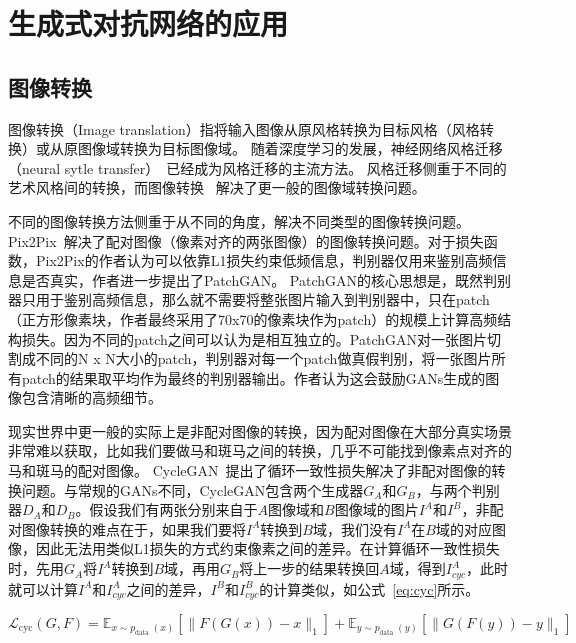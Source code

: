 \section{生成式对抗网络的应用}

\subsection{图像转换}

图像转换（Image translation）指将输入图像从原风格转换为目标风格（风格转换）或从原图像域转换为目标图像域。 随着深度学习的发展，神经网络风格迁移（neural sytle transfer）~\cite{transfer0,transfer1,transfer2}已经成为风格迁移的主流方法。 风格迁移侧重于不同的艺术风格间的转换，而图像转换~\cite{i2i0,i2i1,i2i2,cyclegan} 解决了更一般的图像域转换问题。

不同的图像转换方法侧重于从不同的角度，解决不同类型的图像转换问题。Pix2Pix~\cite{pix2pix}解决了配对图像（像素对齐的两张图像）的图像转换问题。对于损失函数，Pix2Pix的作者认为可以依靠L1损失约束低频信息，判别器仅用来鉴别高频信息是否真实，作者进一步提出了PatchGAN。 PatchGAN的核心思想是，既然判别器只用于鉴别高频信息，那么就不需要将整张图片输入到判别器中，只在patch（正方形像素块，作者最终采用了70x70的像素块作为patch）的规模上计算高频结构损失。因为不同的patch之间可以认为是相互独立的。PatchGAN对一张图片切割成不同的N x N大小的patch，判别器对每一个patch做真假判别，将一张图片所有patch的结果取平均作为最终的判别器输出。作者认为这会鼓励GANs生成的图像包含清晰的高频细节。

现实世界中更一般的实际上是非配对图像的转换，因为配对图像在大部分真实场景非常难以获取，比如我们要做马和斑马之间的转换，几乎不可能找到像素点对齐的马和斑马的配对图像。
CycleGAN~\cite{cyclegan}提出了循环一致性损失解决了非配对图像的转换问题。与常规的GANs不同，CycleGAN包含两个生成器$G_A$和$G_B$，与两个判别器$D_A$和$D_B$。假设我们有两张分别来自于$A$图像域和$B$图像域的图片$I^A$和$I^B$，非配对图像转换的难点在于，如果我们要将$I^A$转换到$B$域，我们没有$I^A$在$B$域的对应图像，因此无法用类似L1损失的方式约束像素之间的差异。在计算循环一致性损失时，先用$G_A$将$I^A$转换到$B$域，再用$G_B$将上一步的结果转换回$A$域，得到$I^A_{cyc}$，此时就可以计算$I^A$和$I^A_{cyc}$之间的差异，$I^B$和$I^B_{cyc}$的计算类似，如公式~\ref{eq:cyc}所示。

\begin{equation}
    \mathcal{L}_{\mathrm{cyc}}(G, F) =\mathbb{E}_{x \sim p_{\text {data }}(x)}\left[\|F(G(x))-x\|_{1}\right] +\mathbb{E}_{y \sim p_{\text {data }}(y)}\left[\|G(F(y))-y\|_{1}\right]
    \label{eq:cyc}
\end{equation}


